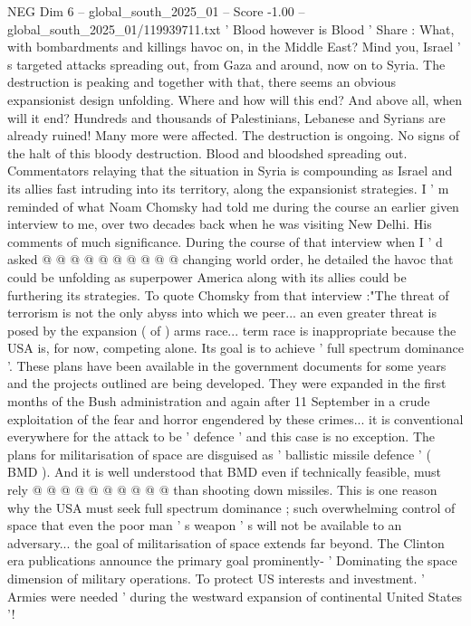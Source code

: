 \begin{textsample}{NEG Dim 6 – global\_south\_2025\_01 – Score -1.00 – global\_south\_2025\_01/119939711.txt}  \label{ex:f6_neg_015}
' Blood however is Blood ' Share : What, with bombardments and killings havoc on, in the Middle East?
Mind you, Israel ' s targeted attacks spreading out, from Gaza and around, now on to Syria.
The destruction is peaking and together with that, there seems an obvious expansionist design unfolding.
Where and how will this end?
And above all, when will it end?
Hundreds and thousands of Palestinians, Lebanese and Syrians are already ruined!
Many more were affected.
The destruction is ongoing.
No signs of the halt of this bloody destruction.
Blood and bloodshed spreading out.
Commentators relaying that the situation in Syria is compounding as Israel and its allies fast intruding into its territory, along the expansionist strategies.
I ' m reminded of what Noam Chomsky had told me during the course an earlier given interview to me, over two decades back when he was visiting New Delhi.
His comments of much significance.
During the course of that interview when I ' d asked @ @ @ @ @ @ @ @ @ @ changing world order, he detailed the havoc that could be unfolding as superpower America along with its allies could be furthering its strategies.
To quote Chomsky from that interview :"The threat of terrorism is not the only abyss into which we peer... an even greater threat is posed by the expansion ( of ) arms race... term race is inappropriate because the USA is, for now, competing alone.
Its goal is to achieve ' full spectrum dominance '.
These plans have been available in the government documents for some years and the projects outlined are being developed.
They were expanded in the first months of the Bush administration and again after 11 September in a crude exploitation of the fear and horror engendered by these crimes... it is conventional everywhere for the attack to be ' defence ' and this case is no exception.
The plans for militarisation of space are disguised as ' ballistic missile defence ' ( BMD ).
And it is well understood that BMD even if technically feasible, must rely @ @ @ @ @ @ @ @ @ @ than shooting down missiles.
This is one reason why the USA must seek full spectrum dominance ; such overwhelming control of space that even the poor man ' s weapon ' s will not be available to an adversary... the goal of militarisation of space extends far beyond.
The Clinton era publications announce the primary goal prominently- ' Dominating the space dimension of military operations.
To protect US interests and investment. ' Armies were needed ' during the westward expansion of continental United States '!

\end{textsample}

